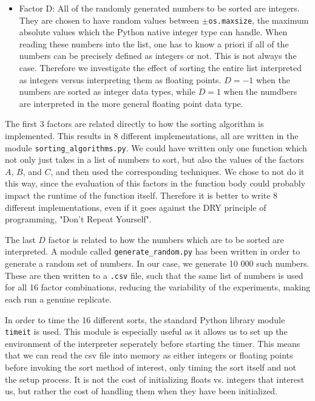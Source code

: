 \begin{itemize}
    \item Factor D: All of the randomly generated numbers to be sorted are integers. They are chosen to have random values between $\pm$\texttt{os.maxsize}, the maximum absolute values which the Python native integer type can handle. When reading these numbers into the list, one has to know a priori if all of the numbers can be precisely defined as integers or not. This is not always the case. Therefore we investigate the effect of sorting the entire list interpreted as integers versus interpreting them as floating points. $D=-1$ when the numbers are sorted as integer data types, while $D=1$ when the numdbers are interpreted in the more general floating point data type.
\end{itemize}

The first 3 factors are related directly to how the sorting algorithm is implemented. This results in 8 different implementations, all are written in the module \texttt{sorting{\_}algorithms.py}. We could have written only one function which not only just takes in a list of numbers to sort, but also the values of the factors $A$, $B$, and $C$, and then used the corresponding techniques. We chose to not do it this way, since the evaluation of this factors in the function body could probably impact the runtime of the function itself. Therefore it is better to write 8 different implementations, even if it goes against the DRY principle of programming, "Don't Repeat Yourself".

The last $D$ factor is related to how the numbers which are to be sorted are interpreted. A module called \texttt{generate{\_}random.py} has been written in order to generate a random set of numbers. In our case, we generate 10 000 such numbers. These are then written to a \texttt{.csv} file, such that the same list of numbers is used for all 16 factor combinations, reducing the variability of the experiments, making each run a genuine replicate.

In order to time the 16 different sorts, the standard Python library module \texttt{timeit} is used. This module is especially useful as it allows us to set up the environment of the interpreter seperately before starting the timer. This means that we can read the csv file into memory as either integers or floating points before invoking the sort method of interest, only timing the sort itself and not the setup process. It is not the cost of initializing floats vs. integers that interest us, but rather the cost of handling them when they have been initialized.

